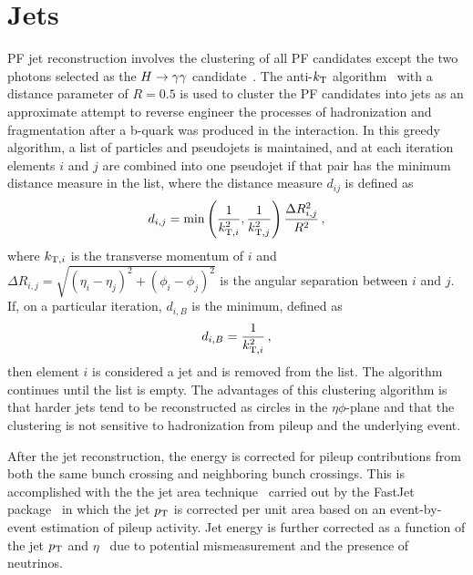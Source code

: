 \section{Jets\label{sec:jets}}

PF jet reconstruction involves the clustering of all PF candidates except the two photons selected
as the $H\to\gamma\gamma$ candidate~\cite{PFPAS2009,CMS-PAS-PFT-10-001}.
The anti-$k_{\rm T}$ algorithm~\cite{Cacciari:2008gp} with a distance parameter of $R = 0.5$ is
used to cluster the PF candidates into jets as an approximate attempt to reverse engineer the
processes of hadronization and fragmentation after a b-quark was produced in the interaction.
In this greedy algorithm, a list of particles and pseudojets is maintained, and at each iteration
elements $i$ and $j$ are combined into one pseudojet if that pair has the minimum distance measure
in the list, where the distance measure $d_{ij}$ is defined as
\begin{equation}
d_{i,j} = \min \left(\frac{1}{k_{{\rm T},i}^2},\frac{1}{k_{{\rm T},j}^2}\right)\frac{\Delta R_{i,j}^2}{R^2} \, ,
\end{equation}
where $k_{{\rm T},i}$ is the transverse momentum of $i$ and $\Delta R_{i,j} = \sqrt{(\eta_i-\eta_j)^2+(\phi_i-\phi_j)^2}$ is the angular separation between $i$ and $j$. If, on a particular iteration,
$d_{i,B}$ is the minimum, defined as
\begin{equation}
d_{i,B} = \frac{1}{k_{{\rm T},i}^2} \, ,
\end{equation}
then element $i$ is considered a jet and is removed from the list. The algorithm continues until the
list is empty.
The advantages of this clustering algorithm is that harder jets tend to be reconstructed as circles
in the $\eta\phi$-plane and that the clustering is not sensitive to hadronization from pileup and the
underlying event.

After the jet reconstruction, the energy is corrected for pileup contributions from both the same
bunch crossing and neighboring bunch crossings. This is accomplished with the the
jet area technique~\cite{Cacciari:2007fd} carried out by the FastJet package~\cite{Cacciari:2011ma}
in which the jet $p_{\rm T}$ is corrected per unit area based on an event-by-event estimation of pileup
activity.
Jet energy is further corrected as a function of the jet $p_{\rm T}$ and $\eta$~\cite{JINST6}
due to potential mismeasurement and the presence of neutrinos.

